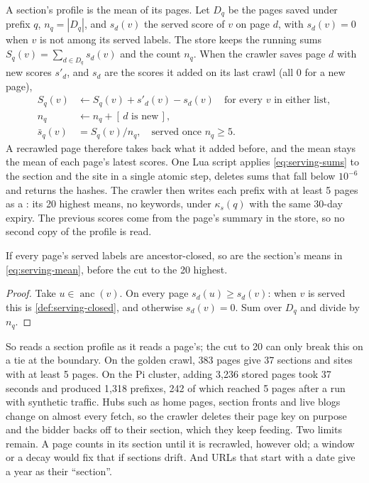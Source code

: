 A section's profile is the mean of its pages. Let $D_q$ be the pages saved
under prefix $q$, $n_q = |D_q|$, and $s_d(v)$ the served score of $v$ on page
$d$, with $s_d(v) = 0$ when $v$ is not among its served labels. The store keeps
the running sums $S_q(v) = \sum_{d \in D_q} s_d(v)$ and the count $n_q$. When
the crawler saves page $d$ with new scores $s'_d$, and $s_d$ are the scores it
added on its last crawl (all $0$ for a new page),
\begin{align}
S_q(v) &\leftarrow S_q(v) + s'_d(v) - s_d(v) \quad\text{for every } v \text{ in either list},\label{eq:serving-sums}\\
n_q &\leftarrow n_q + [\,d \text{ is new}\,],\nonumber\\
\bar{s}_q(v) &= S_q(v) / n_q, \quad\text{served once } n_q \ge 5.\label{eq:serving-mean}
\end{align}
A recrawled page therefore takes back what it added before, and the mean stays
the mean of each page's latest scores. One Lua script applies
\cref{eq:serving-sums} to the section and the site in a single atomic step,
deletes sums that fall below $10^{-6}$ and returns the hashes. The crawler then
writes each prefix with at least 5 pages as a : its 20
highest means, no keywords, under $\kappa_s(q)$ with the same 30-day expiry.
The previous scores come from the page's summary in the store, so no second
copy of the profile is read.

\begin{proposition}\label{prop:serving-closed}
If every page's served labels are ancestor-closed, so are the section's means
in \cref{eq:serving-mean}, before the cut to the 20 highest.
\end{proposition}
\begin{proof}
Take $u \in \operatorname{anc}(v)$. On every page $s_d(u) \ge s_d(v)$: when $v$
is served this is \cref{def:serving-closed}, and otherwise $s_d(v) = 0$. Sum
over $D_q$ and divide by $n_q$.
\end{proof}

So  reads a section profile as it reads a page's; the cut to
20 can only break this on a tie at the boundary. On the golden crawl, 383 pages
give 37 sections and sites with at least 5 pages. On the Pi cluster, adding
3,236 stored pages took 37 seconds and produced 1,318 prefixes, 242 of which
reached 5 pages after a run with synthetic traffic. Hubs such as home pages,
section fronts and live blogs change on almost every fetch, so the crawler
deletes their page key on purpose and the bidder backs off to their section,
which they keep feeding. Two limits remain. A page counts in its section until
it is recrawled, however old; a window or a decay would fix that if sections
drift. And URLs that start with a date give a year as their ``section''.

